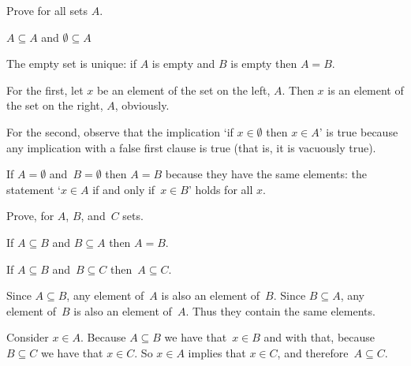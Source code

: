 \documentclass{ibl}
\begin{document}
\begin{ex} \label{ex:EmptySetUnique}
Prove for all sets $A$. 
\begin{exes}
\item $A\subseteq A$ and $\emptyset\subseteq A$
\item The empty set is unique: if $A$ is empty and $B$ is empty then $A=B$.
\end{exes}
\begin{ans}
\begin{exes}
\item For the first, let $x$ be an element of the set on the left, $A$.
  Then $x$ is an element of the set on the right, $A$, obviously.

  For the second, observe that the implication 
  `if $x\in\emptyset$ then $x\in A$' is true 
  because any implication with a false first clause is true
  (that is, it is vacuously true).
\item If $A=\emptyset$ and~$B=\emptyset$ then $A=B$ because they have the
  same elements: the statement `$x\in A$ if and only if~$x\in B$' holds   
  for all $x$.
\end{exes}
\end{ans}
\end{ex}

\begin{ex}  \label{ex:PropertiesOfSubset}
Prove, for $A$, $B$, and~$C$ sets.
\begin{exes} 
\item {}
  If $A\subseteq B$ and $B\subseteq A$ then $A=B$.  
\item {}
  If $A\subseteq B$ and~$B\subseteq C$ then~$A\subseteq C$.  
\end{exes}
\begin{ans}
\begin{exes}
\item Since $A\subseteq B$, any element of~$A$ is also an element of~$B$.
   Since $B\subseteq A$, any element of~$B$ is also an element of~$A$.
   Thus they contain the same elements.
\item Consider $x\in A$.
   Because $A\subseteq B$ we have that~$x\in B$ and with that, because
   $B\subseteq C$ we have that $x\in C$.
   So $x\in A$ implies that $x\in C$, and therefore~$A\subseteq C$.
\end{exes}
\end{ans}
\end{ex}
\end{document}
